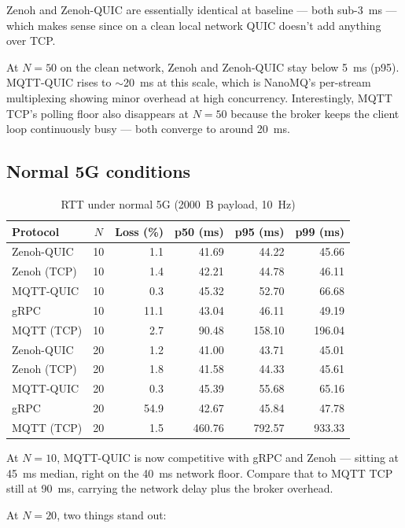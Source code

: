 \documentclass[11pt,a4paper]{article}
\begin{document}
Zenoh and Zenoh-QUIC are essentially identical at baseline --- both sub-3~ms --- which makes sense since on a clean local network QUIC doesn't add anything over TCP.

At $N=50$ on the clean network, Zenoh and Zenoh-QUIC stay below 5~ms (p95). MQTT-QUIC rises to $\sim$20~ms at this scale, which is NanoMQ's per-stream multiplexing showing minor overhead at high concurrency. Interestingly, MQTT TCP's polling floor also disappears at $N=50$ because the broker keeps the client loop continuously busy --- both converge to around 20~ms.

\subsection{Normal 5G conditions}

\begin{table}[H]
\centering
\caption{RTT under normal 5G (2000~B payload, 10~Hz)}
\label{tab:good5g}
\begin{tabular}{lcrrrr}
\toprule
Protocol & $N$ & Loss (\%) & p50 (ms) & p95 (ms) & p99 (ms) \\
\midrule
Zenoh-QUIC  & 10 & 1.1  & 41.69  & 44.22  & 45.66 \\
Zenoh (TCP) & 10 & 1.4  & 42.21  & 44.78  & 46.11 \\
MQTT-QUIC   & 10 & 0.3  & 45.32  & 52.70  & 66.68 \\
gRPC        & 10 & 11.1 & 43.04  & 46.11  & 49.19 \\
MQTT (TCP)  & 10 & 2.7  & 90.48  & 158.10 & 196.04 \\
\midrule
Zenoh-QUIC  & 20 & 1.2  & 41.00  & 43.71  & 45.01 \\
Zenoh (TCP) & 20 & 1.8  & 41.58  & 44.33  & 45.61 \\
MQTT-QUIC   & 20 & 0.3  & 45.39  & 55.68  & 65.16 \\
gRPC        & 20 & 54.9 & 42.67  & 45.84  & 47.78 \\
MQTT (TCP)  & 20 & 1.5  & 460.76 & 792.57 & 933.33 \\
\bottomrule
\end{tabular}
\end{table}

At $N=10$, MQTT-QUIC is now competitive with gRPC and Zenoh --- sitting at 45~ms median, right on the 40~ms network floor. Compare that to MQTT TCP still at 90~ms, carrying the network delay plus the broker overhead.

At $N=20$, two things stand out:
\end{document}
